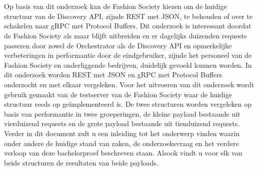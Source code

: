 
%
%

%



\chapter*{}

Op basis van dit onderzoek kan de Fashion Society kiezen om de huidige structuur van de Discovery API, zijnde REST met JSON, te behouden of over te schakelen naar gRPC met Protocol Buffers. Dit onderzoek is interessant doordat de Fashion Society als maar blijft uitbreiden en er dagelijks duizenden requests passeren door zowel de Orchestrator als de Discovery API en opmerkelijke verbeteringen in performantie door de eindgebruiker, zijnde het personeel van de Fashion Society en onderliggende bedrijven, duidelijk gevoeld kunnen worden. In dit onderzoek worden REST met JSON en gRPC met Protocol Buffers onderzocht en met elkaar vergeleken. Voor het uitvoeren van dit onderzoek wordt gebruik gemaakt van de testserver van de Fashion Society waar de huidige structuur reeds op geïmplementeerd is. De twee structuren worden vergeleken op basis van performantie in twee groeperingen, de kleine payload bestaande uit vierduizend requests en de grote payload bestaande uit tienduizend requests. Verder in dit document zult u een inleiding tot het onderwerp vinden waarin onder andere de huidige stand van zaken, de onderzoeksvraag en het verdere verloop van deze bachelorproef beschreven staan. Alsook vindt u voor elk van beide structuren de resultaten van beide payloads.

